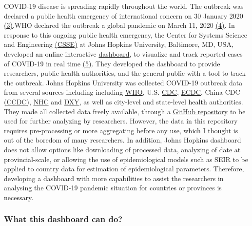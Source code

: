\documentclass[
]{article}
\begin{document}
COVID-19 disease is spreading rapidly throughout the world. The outbreak
was declared a public health emergency of international concern on 30
January 2020
\href{https://www.who.int/emergencies/diseases/novel-coronavirus-2019/events-as-they-happen}{(3)}.WHO
declared the outbreak a global pandemic on March 11, 2020
\href{https://www.who.int/dg/speeches/detail/who-director-general-s-opening-remarks-at-the-media-briefing-on-covid-19---11-march-2020}{(4)}.
In response to this ongoing public health emergency, the Center for
Systems Science and Engineering \href{https://systems.jhu.edu/}{(CSSE)}
at Johns Hopkins University, Baltimore, MD, USA, developed an online
interactive \href{https://coronavirus.jhu.edu/map.html}{dashboard}, to
visualize and track reported cases of COVID-19 in real time
\href{https://www.thelancet.com/journals/laninf/article/PIIS1473-3099\%2820\%2930120-1/fulltext}{(5)}.
They developed the dashboard to provide researchers, public health
authorities, and the general public with a tool to track the outbreak.
Johns Hopkins University was collected COVID-19 outbreak data from
several sources including including
\href{https://www.who.int/emergencies/diseases/novel-coronavirus-2019/situation-reports}{WHO},
U.S. \href{https://www.cdc.gov/coronavirus/2019-ncov/index.html}{CDC},
\href{https://www.ecdc.europa.eu/en/home}{ECDC}, China CDC
\href{http://www.chinacdc.cn/en/}{(CCDC)},
\href{http://www.nhc.gov.cn/yjb/s3578/new_list.shtml}{NHC} and
\href{https://3g.dxy.cn/newh5/view/pneumonia?scene=2\&clicktime=1579582238\&enterid=1579582238\&from=singlemessage\&isappinstalled=0}{DXY},
as well as city-level and state-level health authorities. They made all
collected data freely available, through a
\href{https://github.com/CSSEGISandData/COVID-19}{GitHub repository} to
be used for further analyzing by researchers. However, the data in this
repository requires pre-processing or more aggregating before any use,
which I thought is out of the boredom of many researchers. In addition,
Johns Hopkins dashboard does not allow options like downloading of
processed data, analyzing of date at provincial-scale, or allowing the
use of epidemiological models such as SEIR to be applied to country data
for estimation of epidemiological parameters. Therefore, developing a
dashboard with more capabilities to assist the researchers in analysing
the COVID-19 pandemic situation for countries or provinces is necessary.

\hypertarget{what-this-dashboard-can-do}{%
\subsubsection{What this dashboard can
do?}\label{what-this-dashboard-can-do}}
\end{document}
